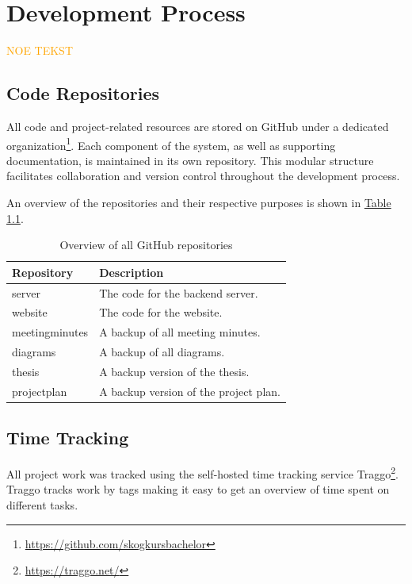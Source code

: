 \chapter{Development Process}

\textcolor{orange}{NOE TEKST}

\section{Code Repositories}

All code and project-related resources are stored on GitHub under a dedicated organization\footnote{\url{https://github.com/skogkursbachelor}}. Each component of the system, as well as supporting documentation, is maintained in its own repository. This modular structure facilitates collaboration and version control throughout the development process.

An overview of the repositories and their respective purposes is shown in \hyperref[tab:github_repositories]{Table \ref*{tab:github_repositories}}.

\begin{table}[h]
    \centering
    \begin{tabular}{l|l}
        \hline
        \textbf{Repository} & \textbf{Description} \\
        \hline
        server & The code for the backend server. \\
        website & The code for the website. \\
        \hline
        meetingminutes & A backup of all meeting minutes. \\
        diagrams & A backup of all diagrams. \\
        thesis & A backup version of the thesis. \\
        projectplan & A backup version of the project plan. \\
        \hline
    \end{tabular}
    \caption{Overview of all GitHub repositories\footnotemark}
    \label{tab:github_repositories}
\end{table}

\section{Time Tracking}

All project work was tracked using the self-hosted time tracking service Traggo\footnote{\url{https://traggo.net/}}. Traggo tracks work by tags making it easy to get an overview of time spent on different tasks.

